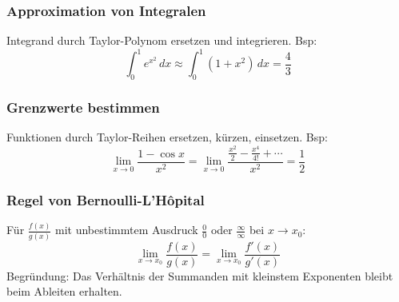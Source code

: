 \subsubsection{Approximation von Integralen}
Integrand durch Taylor-Polynom ersetzen und integrieren. Bsp:
\[
    \int_0^1 e^{x^2}\,dx \approx \int_0^1 (1+x^2)\,dx = \frac{4}{3}
\]

\subsubsection{Grenzwerte bestimmen}
Funktionen durch Taylor-Reihen ersetzen, kürzen, einsetzen. Bsp:
\[
    \lim_{x\to 0}\frac{1-\cos x}{x^2} = \lim_{x\to 0}\frac{\frac{x^2}{2} - \frac{x^4}{4!} + \cdots}{x^2} = \frac{1}{2}
\]

\subsubsection{Regel von Bernoulli-L'Hôpital}
Für \(\frac{f(x)}{g(x)}\) mit unbestimmtem Ausdruck \(\frac{0}{0}\) oder \(\frac{\infty}{\infty}\) bei \(x \to x_0\):
\[
    \lim_{x\to x_0} \frac{f(x)}{g(x)} = \lim_{x\to x_0} \frac{f'(x)}{g'(x)}
\]
Begründung: Das Verhältnis der Summanden mit kleinstem Exponenten bleibt beim Ableiten erhalten.
